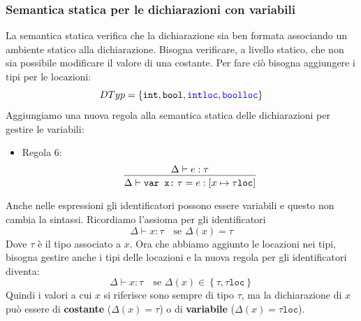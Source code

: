 \documentclass[a4paper]{article}
\begin{document}
\subsubsection{Semantica statica per le dichiarazioni con variabili}
La semantica statica verifica che la dichiarazione sia ben formata associando un
ambiente statico alla dichiarazione.
Bisogna verificare, a livello statico, che non sia possibile modificare il valore
di una costante. Per fare ciò bisogna aggiungere i tipi per le locazioni:
\[
  DTyp = \left\{ \texttt{int}, \texttt{bool}, \mathcolor{blue}{\texttt{intloc}},
  \mathcolor{blue}{\texttt{boolloc}} \right\}
\] 
Aggiungiamo una nuova regola alla semantica statica delle dichiarazioni
per gestire le variabili:

\begin{itemize}
  \item Regola 6:
    \[
      \begin{prooftree}
        \hypo{ \Delta \vdash e : \tau }
        \infer1{ \Delta \vdash \texttt{var x:}\; \tau = e : \left[ x \mapsto \tau\texttt{loc} \right] }
      \end{prooftree}
    \] 
\end{itemize}

\dfn{}
{
  Anche nelle espressioni gli identificatori possono essere variabili e questo non
  cambia la sintassi.
}
Ricordiamo l'assioma per gli identificatori
\[
  \Delta \vdash x: \tau \quad \text{se } \Delta(x) = \tau
\] 
Dove \( \tau \) è il tipo associato a \( x \). Ora che abbiamo aggiunto le locazioni
nei tipi, bisogna gestire anche i tipi delle locazioni e la nuova regola per gli 
identificatori diventa:
\[
  \Delta \vdash x: \tau \quad \text{se } \Delta(x) \in \left\{ \tau, \tau\texttt{loc} \right\}
\] 
Quindi i valori a cui \( x \) si riferisce sono sempre di tipo \( \tau \), ma la
dichiarazione di \( x \) può essere di \textbf{costante} (\( \Delta(x) = \tau \)) o di
\textbf{variabile} (\( \Delta(x) = \tau\texttt{loc} \)).
\end{document}
